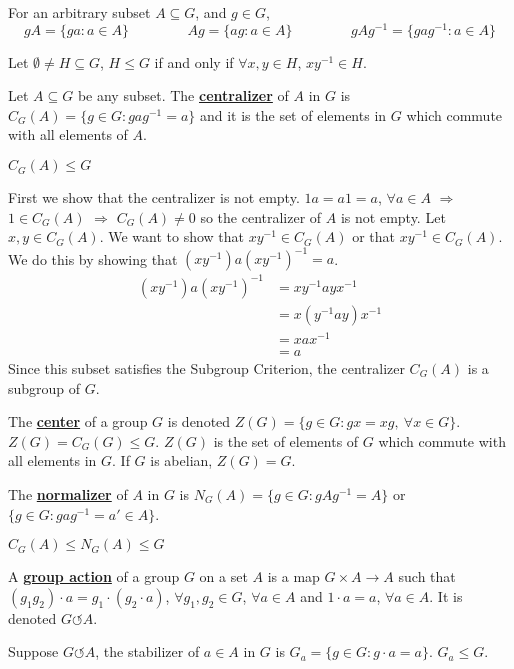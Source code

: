 \documentclass[11pt,letterpaper]{book}
\newcommand{\define}[1]{\underline{\textbf{#1}}}
\newcommand{\pn}[1]{\left( #1 \right)}
\theoremstyle{definition}
\begin{document}
For an arbitrary subset $A\subseteq G$, and $g\in G$,
$$gA=\{ga:a\in A\}\hspace{50pt}Ag=\{ag:a\in A\}\hspace{50pt}gAg^{-1}=\{gag^{-1}:a\in A\}$$

\begin{bthm}
    Let $\emptyset\ne H\subseteq G$, $H\le G$ if and only if $\forall x,y\in H$, $xy^{-1}\in H$.
\end{bthm}

\begin{defi}
    Let $A\subseteq G$ be any subset. The \define{centralizer} of $A$ in $G$ is $C_G(A)=\{g\in G:gag^{-1}=a\}$ and it is the set of elements in $G$ which commute with all elements of $A$.
\end{defi}

\begin{prop}
    $C_G(A)\le G$
\end{prop}

\begin{pf}
    First we show that the centralizer is not empty. $1a=a1=a$, $\forall a\in A$ $\Rightarrow$ $1\in C_G(A)$ $\Rightarrow$ $C_G(A)\ne0$ so the centralizer of $A$ is not empty. Let $x,y\in C_G(A)$. We want to show that $xy^{-1}\in C_G(A)$ or that $xy^{-1}\in C_G(A)$. We do this by showing that $\pn{xy^{-1}}a\pn{xy^{-1}}^{-1}=a$.
    \begin{align*}
        \pn{xy^{-1}}a\pn{xy^{-1}}^{-1}&=xy^{-1}ayx^{-1}\\
        &=x\pn{y^{-1}ay}x^{-1}\\
        &=xax^{-1}\tag*{($y\in C_G(A)$)}\\
        &=a\tag*{($x\in C_G(A)$)}
    \end{align*}
    Since this subset satisfies the Subgroup Criterion, the centralizer $C_G(A)$ is a subgroup of $G$.
\end{pf}

\begin{defi}
    The \define{center} of a group $G$ is denoted $Z(G)=\{g\in G:gx=xg,\ \forall x\in G\}$. $Z(G)=C_G(G)\le G$. $Z(G)$ is the set of elements of $G$ which commute with all elements in $G$. If $G$ is abelian, $Z(G)=G$.
\end{defi}

\begin{defi}
    The \define{normalizer} of $A$ in $G$ is $N_G(A)=\{g\in G:gAg^{-1}=A\}$ or $\{g\in G:gag^{-1}=a'\in A\}$.
\end{defi}

\begin{prop}
    $C_G(A)\le N_G(A)\le G$
\end{prop}

\begin{defi}
    A \define{group action} of a group $G$ on a set $A$ is a map $G\times A\rightarrow A$ such that $(g_1g_2)\cdot a=g_1\cdot\pn{g_2\cdot a}$, $\forall g_1,g_2\in G$, $\forall a\in A$ and $1\cdot a=a$, $\forall a\in A$. It is denoted $G\circlearrowleft A$.
\end{defi}

\begin{defi}
    Suppose $G\circlearrowleft A$, the stabilizer of $a\in A$ in $G$ is $G_a=\{g\in G:g\cdot a=a\}$. $G_a\le G$.
\end{defi}
\end{document}
